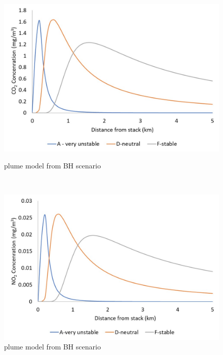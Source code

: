 \begin{figure}[h]
    \centering
    \begin{minipage}[t]{0.5\textwidth}
        \centering
        \includegraphics[width=\linewidth]{chapters/5-safety-layout-environment/figures/CO2plumeBH.jpg}
        \caption{ plume model from BH scenario}
        \label{fig:CO2plumeBH}
    \end{minipage}%
    ~ 
    \begin{minipage}[t]{0.5\textwidth}
        \centering
        \includegraphics[width=\linewidth]{chapters/5-safety-layout-environment/figures/NO2plumeBH.jpg}
        \caption{ plume model from BH scenario}
         \label{fig:NO2plumeBH}
    \end{minipage}
    
\end{figure}


